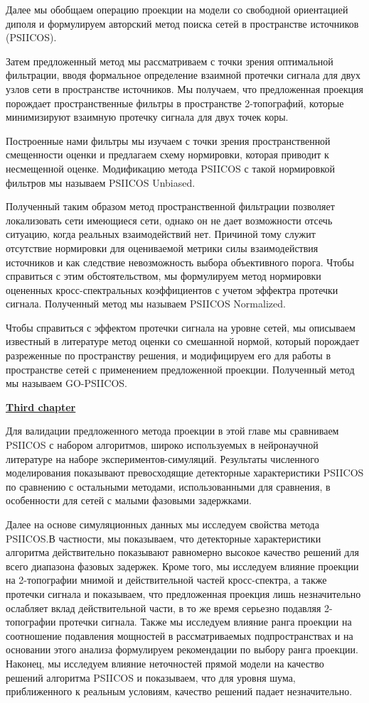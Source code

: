 Далее мы обобщаем операцию проекции на модели со свободной ориентацией диполя и
формулируем авторский метод поиска сетей в пространстве источников (PSIICOS).

Затем предложенный метод мы рассматриваем с точки зрения оптимальной
фильтрации, вводя формальное определение взаимной протечки сигнала для двух
узлов сети в пространстве источников.  Мы получаем, что предложенная проекция
порождает пространственные фильтры в пространстве 2-топографий, которые
минимизируют взаимную протечку сигнала для двух точек коры.

Построенные нами фильтры мы изучаем с точки зрения пространственной смещенности
оценки и предлагаем схему нормировки, которая приводит к несмещенной оценке.
Модификацию метода PSIICOS с такой нормировкой фильтров мы называем PSIICOS
Unbiased.

Полученный таким образом метод пространственной фильтрации позволяет
локализовать сети имеющиеся сети, однако он не дает возможности отсечь
ситуацию, когда реальных взаимодействий нет. Причиной тому служит отсутствие
нормировки для оцениваемой метрики силы взаимодействия источников и как
следствие невозможность выбора объективного порога.  Чтобы справиться с этим
обстоятельством, мы формулируем метод нормировки оцененных кросс-спектральных
коэффициентов с учетом эффектра протечки сигнала. Полученный метод мы называем
PSIICOS Normalized.


Чтобы справиться с эффектом протечки сигнала на уровне сетей, мы описываем
известный в литературе метод оценки со смешанной нормой, который порождает
разреженные по пространству решения, и модифицируем его для работы в
пространстве сетей с применением предложенной проекции. Полученный метод мы
называем GO-PSIICOS.


\underline{\textbf{Third chapter}}

Для валидации предложенного метода проекции в этой главе мы сравниваем PSIICOS
с набором алгоритмов, широко используемых в нейронаучной литературе на наборе
экспериментов-симуляций.  Результаты численного моделирования показывают
превосходящие детекторные характеристики PSIICOS по сравнению с остальными
методами, использованными для сравнения, в особенности для сетей с малыми
фазовыми задержками.

Далее на основе симуляционных данных мы исследуем свойства метода PSIICOS.\@ В
частности, мы показываем, что детекторные характеристики алгоритма
действительно показывают равномерно высокое качество решений для всего
диапазона фазовых задержек. Кроме того, мы исследуем влияние проекции на
2-топографии мнимой и действительной частей кросс-спектра, а также протечки
сигнала и показываем, что предложенная проекция лишь незначительно ослабляет
вклад действительной части, в то же время серьезно подавляя 2-топографии
протечки сигнала. Также мы исследуем влияние ранга проекции на соотношение
подавления мощностей в рассматриваемых подпространствах и на основании этого
анализа формулируем рекомендации по выбору ранга проекции.  Наконец, мы
исследуем влияние неточностей прямой модели на качество решений алгоритма
PSIICOS и показываем, что для уровня шума, приближенного к реальным условиям,
качество решений падает незначительно.

